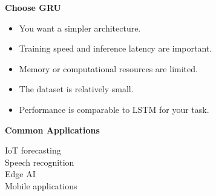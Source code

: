 \documentclass[11pt]{article}
\begin{document}
\begin{minipage}[t]{0.47\textwidth}

{\large\color{brandorange}\textbf{Choose GRU}}

\vspace{0.05in}

\begin{itemize}[leftmargin=*, itemsep=0.08in,
label={\color{brandorange}\textbullet}]

\item You want a simpler architecture.

\item Training speed and inference latency are important.

\item Memory or computational resources are limited.

\item The dataset is relatively small.

\item Performance is comparable to LSTM for your task.

\end{itemize}

\vspace{0.08in}

\textbf{Common Applications}

{\small
IoT forecasting\\
Speech recognition\\
Edge AI\\
Mobile applications
}

\end{minipage}
\hfill
\end{document}
